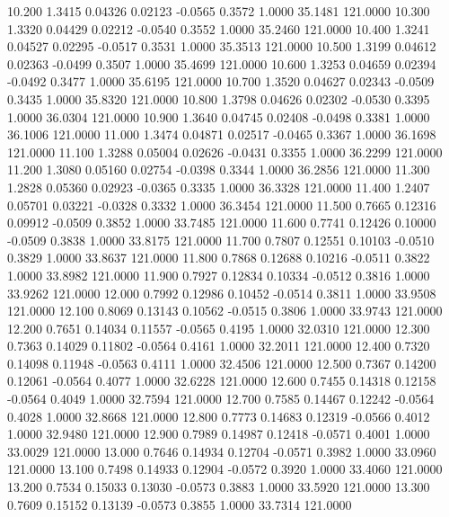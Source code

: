   10.200   1.3415   0.04326   0.02123  -0.0565   0.3572   1.0000  35.1481 121.0000
  10.300   1.3320   0.04429   0.02212  -0.0540   0.3552   1.0000  35.2460 121.0000
  10.400   1.3241   0.04527   0.02295  -0.0517   0.3531   1.0000  35.3513 121.0000
  10.500   1.3199   0.04612   0.02363  -0.0499   0.3507   1.0000  35.4699 121.0000
  10.600   1.3253   0.04659   0.02394  -0.0492   0.3477   1.0000  35.6195 121.0000
  10.700   1.3520   0.04627   0.02343  -0.0509   0.3435   1.0000  35.8320 121.0000
  10.800   1.3798   0.04626   0.02302  -0.0530   0.3395   1.0000  36.0304 121.0000
  10.900   1.3640   0.04745   0.02408  -0.0498   0.3381   1.0000  36.1006 121.0000
  11.000   1.3474   0.04871   0.02517  -0.0465   0.3367   1.0000  36.1698 121.0000
  11.100   1.3288   0.05004   0.02626  -0.0431   0.3355   1.0000  36.2299 121.0000
  11.200   1.3080   0.05160   0.02754  -0.0398   0.3344   1.0000  36.2856 121.0000
  11.300   1.2828   0.05360   0.02923  -0.0365   0.3335   1.0000  36.3328 121.0000
  11.400   1.2407   0.05701   0.03221  -0.0328   0.3332   1.0000  36.3454 121.0000
  11.500   0.7665   0.12316   0.09912  -0.0509   0.3852   1.0000  33.7485 121.0000
  11.600   0.7741   0.12426   0.10000  -0.0509   0.3838   1.0000  33.8175 121.0000
  11.700   0.7807   0.12551   0.10103  -0.0510   0.3829   1.0000  33.8637 121.0000
  11.800   0.7868   0.12688   0.10216  -0.0511   0.3822   1.0000  33.8982 121.0000
  11.900   0.7927   0.12834   0.10334  -0.0512   0.3816   1.0000  33.9262 121.0000
  12.000   0.7992   0.12986   0.10452  -0.0514   0.3811   1.0000  33.9508 121.0000
  12.100   0.8069   0.13143   0.10562  -0.0515   0.3806   1.0000  33.9743 121.0000
  12.200   0.7651   0.14034   0.11557  -0.0565   0.4195   1.0000  32.0310 121.0000
  12.300   0.7363   0.14029   0.11802  -0.0564   0.4161   1.0000  32.2011 121.0000
  12.400   0.7320   0.14098   0.11948  -0.0563   0.4111   1.0000  32.4506 121.0000
  12.500   0.7367   0.14200   0.12061  -0.0564   0.4077   1.0000  32.6228 121.0000
  12.600   0.7455   0.14318   0.12158  -0.0564   0.4049   1.0000  32.7594 121.0000
  12.700   0.7585   0.14467   0.12242  -0.0564   0.4028   1.0000  32.8668 121.0000
  12.800   0.7773   0.14683   0.12319  -0.0566   0.4012   1.0000  32.9480 121.0000
  12.900   0.7989   0.14987   0.12418  -0.0571   0.4001   1.0000  33.0029 121.0000
  13.000   0.7646   0.14934   0.12704  -0.0571   0.3982   1.0000  33.0960 121.0000
  13.100   0.7498   0.14933   0.12904  -0.0572   0.3920   1.0000  33.4060 121.0000
  13.200   0.7534   0.15033   0.13030  -0.0573   0.3883   1.0000  33.5920 121.0000
  13.300   0.7609   0.15152   0.13139  -0.0573   0.3855   1.0000  33.7314 121.0000
